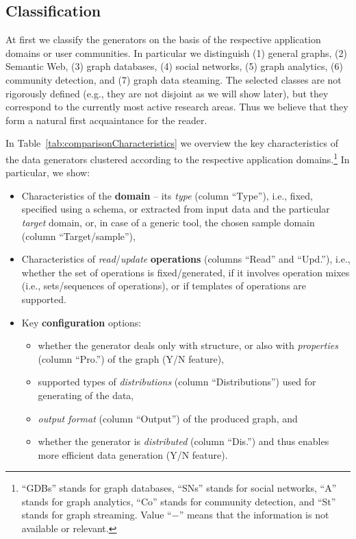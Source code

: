 %

\subsection{Classification}

At first we classify the generators on the basis of the respective application domains or user communities. In particular we distinguish (1) general graphs, (2) Semantic Web, (3) graph databases, (4) social networks, (5) graph analytics, (6) community detection, and (7) graph data steaming. The selected classes are not rigorously defined (e.g., they are not disjoint as we will show later), but they correspond to the currently most active research areas. Thus we believe that they form a natural first acquaintance for the reader.

In Table~\ref{tab:comparisonCharacteristics}   we overview the key characteristics of the data generators clustered according to the respective application domains.\footnote{``GDBs'' stands for graph databases, ``SNs'' stands for social networks, ``A'' stands for graph analytics, ``Co'' stands for community detection, and ``St'' stands for graph streaming. Value ``$-$'' means that the information is not available or relevant.} In particular, we show:

\begin{itemize}
\item Characteristics of the \textbf{domain} -- its \textit{type} (column ``Type''), i.e.,  fixed, specified using a schema, or extracted from input data and the particular \textit{target} domain, or, in case of a generic tool, the chosen sample domain (column ``Target/sample''),
\item Characteristics of \textit{read}/\textit{update} \textbf{operations} (columns ``Read'' and ``Upd.''), i.e., whether the set of operations is fixed/generated, if it involves operation mixes (i.e., sets/sequences of operations), or if templates of operations are supported.
\item Key \textbf{configuration} options:
  \begin{itemize}
    \item whether the generator deals only with structure, or also with \emph{properties} (column ``Pro.'') of the graph (Y/N feature),
    \item supported types of \emph{distributions} (column ``Distributions'') used for generating of the data,
    \item \textit{output format} (column ``Output'') of the produced graph, and
    \item  whether the generator is \textit{distributed} (column ``Dis.'') and thus enables more efficient data generation (Y/N feature).
  \end{itemize}
\end{itemize}


